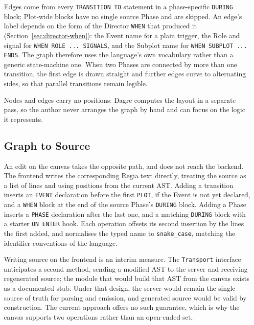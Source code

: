 Edges come from every \lstinline|TRANSITION TO| statement in a phase-specific \lstinline|DURING| block; Plot-wide blocks have no single source Phase and are skipped. An edge's label depends on the form of the Director \lstinline|WHEN| that produced it (Section~\ref{sec:director-when}): the Event name for a plain trigger, the Role and signal for \lstinline|WHEN ROLE ... SIGNALS|, and the Subplot name for \lstinline|WHEN SUBPLOT ... ENDS|. The graph therefore uses the language's own vocabulary rather than a generic state-machine one. When two Phases are connected by more than one transition, the first edge is drawn straight and further edges curve to alternating sides, so that parallel transitions remain legible.
 
Nodes and edges carry no positions: Dagre computes the layout in a separate pass, so the author never arranges the graph by hand and can focus on the logic it represents.
 
\subsection{Graph to Source}
\label{sec:graph-to-source}
 
An edit on the canvas takes the opposite path, and does not reach the backend. The frontend writes the corresponding Regia text directly, treating the source as a list of lines and using positions from the current AST. Adding a transition inserts an \lstinline|EVENT| declaration before the first \lstinline|PLOT|, if the Event is not yet declared, and a \lstinline|WHEN| block at the end of the source Phase's \lstinline|DURING| block. Adding a Phase inserts a \lstinline|PHASE| declaration after the last one, and a matching \lstinline|DURING| block with a starter \lstinline|ON ENTER| hook. Each operation offsets its second insertion by the lines the first added, and normalises the typed name to \lstinline|snake_case|, matching the identifier conventions of the language.
 
Writing source on the frontend is an interim measure. The \lstinline|Transport| interface anticipates a second method, sending a modified AST to the server and receiving regenerated source; the module that would build that AST from the canvas exists as a documented stub. Under that design, the server would remain the single source of truth for parsing and emission, and generated source would be valid by construction. The current approach offers no such guarantee, which is why the canvas supports two operations rather than an open-ended set.
 

